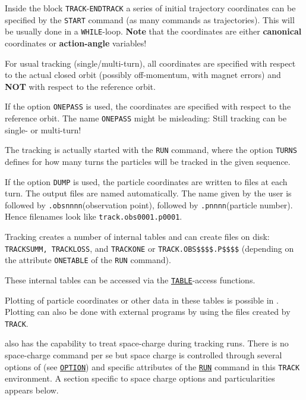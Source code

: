 Inside the block {\tt TRACK}-{\tt ENDTRACK} a series 
of initial trajectory coordinates can be specified by the {\tt START} 
command (as many commands as trajectories). This will be usually done in a 
{\tt WHILE}-loop. {\bf Note} that the coordinates are either 
{\bf canonical} coordinates or {\bf action-angle} variables!

For usual tracking (single/multi-turn), all coordinates are specified
with respect to the actual closed orbit (possibly off-momentum, with
magnet errors) and {\bf NOT} with respect to the reference orbit. 

If the option {\tt ONEPASS} is used, the coordinates are specified
with respect to the reference orbit. The name {\tt ONEPASS} might be
misleading: Still tracking can be single- or multi-turn!   

The tracking is actually started with the {\tt RUN} command, where
the option {\tt TURNS} defines for how many turns the particles will
be tracked in the given sequence. 

If the option {\tt DUMP} is used, the particle coordinates are
written to files at each turn. The output files are named
automatically. The name given by the user is followed by
{\tt .obsnnnn}(observation point), followed by {\tt .pnnnn}(particle number). 
Hence filenames look like {\tt track.obs0001.p0001}.  

Tracking creates a number of internal tables and can create files on disk: 
{\tt TRACKSUMM, TRACKLOSS}, and {\tt TRACKONE} or
{\tt TRACK.OBS\$\$\$\$.P\$\$\$\$} (depending on the attribute
{\tt ONETABLE} of the {\tt RUN} command).

These internal tables can be accessed via the
\hyperref[chap:tables]{\tt TABLE}-access functions.

Plotting of particle coordinates or other data in these tables is
possible in \madx. Plotting can also be done with external programs by
using the files created by {\tt TRACK}.  

\madx also has the capability to treat space-charge during tracking
runs. There is no space-charge command per se but space charge is
controlled through several options of \madx (see
\hyperref[sec:option]{\tt OPTION}) and specific attributes of the
\hyperref[sec:run]{\tt RUN} command in this {\tt TRACK} environment. A
section specific to space charge options and particularities appears
below.






